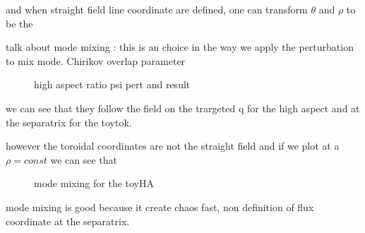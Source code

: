 and when straight field line coordinate are defined, one can transform $\theta$ and $\rho$ to be the 

talk about mode mixing : this is an choice in the way we apply the perturbation to mix mode.
Chirikov overlap parameter

\begin{figure}[h!]
    \hfill
    \caption{high aspect ratio psi pert and result}
\end{figure}

we can see that they follow the field on the trargeted q for the high aspect and at the separatrix for the toytok. 

however the toroidal coordinates are not the straight field and if we plot at a $\rho = const$ we can see that

\begin{figure}[h!]
    \hfill
    \caption{mode mixing for the toyHA}
\end{figure}

mode mixing is good because it create chaos fast, non definition of flux coordinate at the separatrix. 

\begin{figure}[h!]
    \hfill
    \caption{}
\end{figure}

